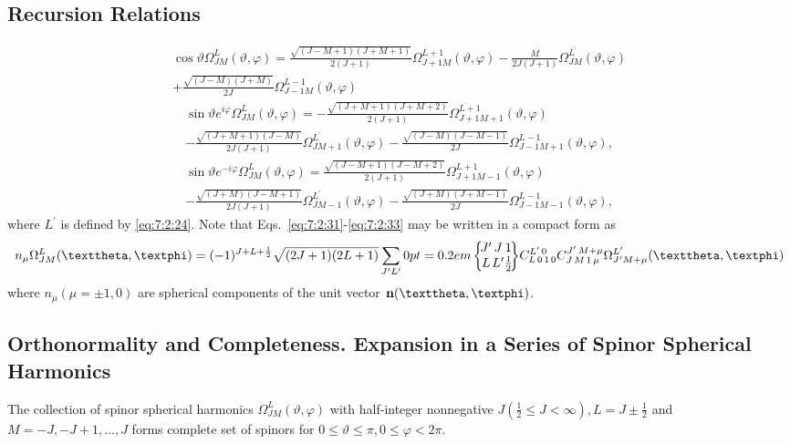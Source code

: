 \subsection{Recursion Relations}\label{sec:7.2.6}
\begin{multline}
\cos \vartheta \Omega_{J M}^{L}(\vartheta, \varphi)=\frac{\sqrt{(J-M+1)(J+M+1)}}{2(J+1)} \Omega_{J+1 M}^{L+1}(\vartheta, \varphi)-\frac{M}{2 J(J+1)} \Omega_{J M}^{L^{\prime}}(\vartheta, \varphi)  \\
+\frac{\sqrt{(J-M)(J+M)}}{2 J} \Omega_{J-1 M}^{L-1}(\vartheta, \varphi)  \label{eq:7:2:31}
\end{multline}
\begin{multline}
\sin \vartheta e^{i \varphi} \Omega_{J M}^{L}(\vartheta, \varphi)=-\frac{\sqrt{(J+M+1)(J+M+2)}}{2(J+1)} \Omega_{J+1 M+1}^{L+1}(\vartheta, \varphi)  \\
-\frac{\sqrt{(J+M+1)(J-M)}}{2 J(J+1)} \Omega_{J M+1}^{L^{\prime}}(\vartheta, \varphi)-\frac{\sqrt{(J-M)(J-M-1)}}{2 J} \Omega_{J-1 M+1}^{L-1}(\vartheta, \varphi), \label{eq:7:2:32}
\end{multline}
\begin{multline}
\sin \vartheta e^{-i \varphi} \Omega_{J M}^{L}(\vartheta, \varphi)=\frac{\sqrt{(J-M+1)(J-M+2)}}{2(J+1)} \Omega_{J+1 M-1}^{L+1}(\vartheta, \varphi)  \\
-\frac{\sqrt{(J+M)(J-M+1)}}{2 J(J+1)} \Omega_{J M-1}^{L^{\prime}}(\vartheta, \varphi)-\frac{\sqrt{(J+M)(J+M-1)}}{2 J} \Omega_{J-1 M-1}^{L-1}(\vartheta, \varphi), \label{eq:7:2:33}
\end{multline}
where $L^{\prime}$ is defined by \eqref{eq:7:2:24}. Note that Eqs.~\eqref{eq:7:2:31}-\eqref{eq:7:2:33} may be written in a compact form as
\begin{equation}
n_{\mu} \Omega_{J M}^{L}(\vartheta, \varphi)=(-1)^{J+L+\frac{1}{2}} \sqrt{(2 J+1)(2 L+1)} \sum_{J^{\prime} L^{\prime}}\sixj{J^{\prime}}{J}{1}{L}{L^{\prime}}{\frac{1}{2}}\label{eq:7:2:34} \clebsch{L}{0}{1}{0}{L^{\prime}}{0} \clebsch{J}{M}{1}{\mu}{J^{\prime}}{M+\mu} \Omega_{J^{\prime} M+\mu}^{L^{\prime}}(\vartheta, \varphi)
\end{equation}
where $n_{\mu}(\mu= \pm 1,0)$ are spherical components of the unit vector $\vect n(\vartheta, \varphi)$.

\subsection{Orthonormality and Completeness. Expansion in a Series of Spinor Spherical Harmonics}\label{sec:7.2.7}
The collection of spinor spherical harmonics $\Omega_{J M}^{L}(\vartheta, \varphi)$ with half-integer nonnegative $J\left(\frac{1}{2} \leq J<\infty\right), L= J \pm \frac{1}{2}$ and $M=-J,-J+1, \ldots, J$ forms complete set of spinors for $0 \leq \vartheta \leq \pi, 0 \leq \varphi<2 \pi$.

